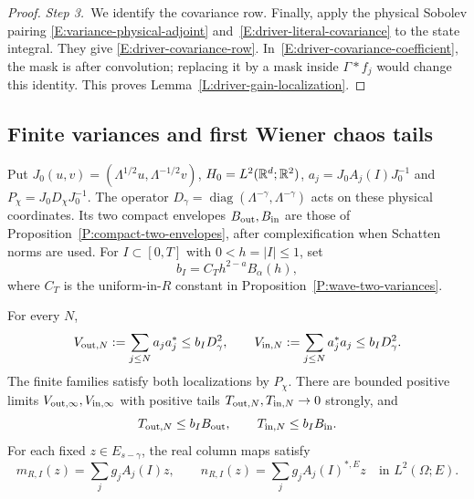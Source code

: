 \begin{proof}
  \medskip
  \noindent\textit{Step 3.~}We identify the covariance row.
  Finally, apply the physical Sobolev pairing
  \eqref{E:variance-physical-adjoint} and~\eqref{E:driver-literal-covariance} to
  the state integral. They give \eqref{E:driver-covariance-row}.
  In~\eqref{E:driver-covariance-coefficient}, the mask is after convolution;
  replacing it by a mask inside $\Gamma*f_j$ would change this identity. This
  proves Lemma~\ref{L:driver-gain-localization}.
\end{proof}

\subsection{Finite variances and first Wiener chaos tails}

Put $J_0(u,v) = (\Lambda^{1/2}u,\Lambda^{-1/2}v)$, $H_0 = L^2(\mathbb{R}^d;\mathbb{R}^2)$, $a_j
= J_0A_j(I)J_0^{-1}$ and $P_\chi = J_0D_\chi J_0^{-1}$. The operator $D_\gamma =
\operatorname{diag}(\Lambda^{-\gamma},\Lambda^{-\gamma})$ acts on these physical
coordinates. Its two compact envelopes $B_{\rm out},B_{\rm in}$ are those of
Proposition~\ref{P:compact-two-envelopes}, after complexification when Schatten
norms are used. For $I \subset [0,T]$ with $0 < h = |I| \le 1$, set
\begin{equation}\label{E:driver-short-variance-budget}
  b_I=C_T h^{2-a}B_\alpha(h),
\end{equation}
where $C_T$ is the uniform-in-$R$ constant in
Proposition~\ref{P:wave-two-variances}.

\begin{lemma}\label{L:driver-actual-variances}
  For every $N$,
  \begin{equation}\label{E:driver-two-variances}
    V_{{\rm out},N}:=\sum_{j\le N}a_ja_j^*\le b_ID_\gamma^2,
    \qquad V_{{\rm in},N}:=\sum_{j\le N}a_j^*a_j\le b_ID_\gamma^2.
  \end{equation}
  The finite families satisfy both localizations by $P_\chi$. There are bounded
  positive limits $V_{{\rm out},\infty},V_{{\rm in},\infty}$ with positive tails
  $T_{{\rm out},N},T_{{\rm in},N} \to 0$ strongly, and
  \begin{equation}\label{E:driver-compact-tail-envelopes}
    T_{{\rm out},N}\le b_IB_{\rm out},\qquad
    T_{{\rm in},N}\le b_IB_{\rm in}.
  \end{equation}
  For each fixed $z \in E_{s-\gamma}$, the real column maps satisfy
  \begin{equation}\label{E:driver-column-expansions}
    m_{R,I}(z)=\sum_jg_jA_j(I)z,\qquad
    n_{R,I}(z)=\sum_jg_jA_j(I)^{*,E}z
    \quad\text{in }L^2(\Omega;E).
  \end{equation}
\end{lemma}

